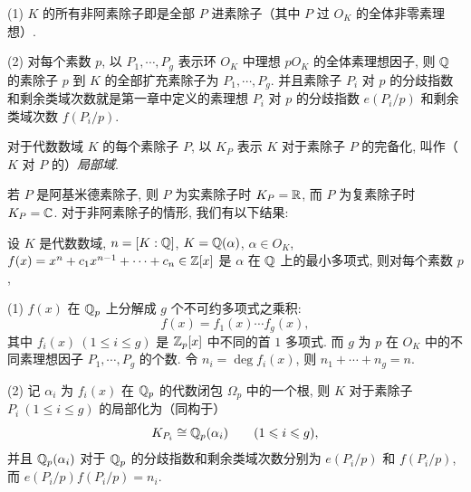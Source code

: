 \begin{theorem}\label{thm:8.21}
(1) $K$ 的所有非阿素除子即是全部 $P$ 进素除子（其中 $P$ 过 $O_K$ 的全体非零素理想）.

(2) 对每个素数 $p$, 以 $P_1,\cdots,P_g$ 表示环 $O_K$ 中理想 $pO_K$ 的全体素理想因子, 则 $\mathbb{Q}$ 的素除子 $p$ 到 $K$ 的全部扩充素除子为 $P_1,\cdots,P_g$. 并且素除子 $P_i$ 对 $p$ 的分歧指数和剩余类域次数就是第一章中定义的素理想 $P_i$ 对 $p$ 的分歧指数 $e(P_i/p)$ 和剩余类域次数 $f(P_i/p)$.
\end{theorem}

\begin{definition}\label{def:ch8-3}
对于代数数域 $K$ 的每个素除子 $P$, 以 $K_P$ 表示 $K$ 对于素除子 $P$ 的完备化, 叫作（$K$ 对 $P$ 的）\emph{局部域}.
\end{definition}

若 $P$ 是阿基米德素除子, 则 $P$ 为实素除子时 $K_P=\mathbb{R}$, 而 $P$ 为复素除子时 $K_P=\mathbb{C}$. 对于非阿素除子的情形, 我们有以下结果:

\begin{theorem}\label{thm:8.22}
设 $K$ 是代数数域, $n=[K:\mathbb{Q}]$, $K=\mathbb{Q}(\alpha)$, $\alpha\in O_K$, $f(x)=x^n+c_1x^{n-1}+\cdots+c_n\in\mathbb{Z}[x]$ 是 $\alpha$ 在 $\mathbb{Q}$ 上的最小多项式, 则对每个素数 $p$,

(1) $f(x)$ 在 $\mathbb{Q}_p$ 上分解成 $g$ 个不可约多项式之乘积:
\[
  f(x)=f_1(x)\cdots f_g(x),
\]
其中 $f_i(x)\ (1\leqslant i\leqslant g)$ 是 $\mathbb{Z}_p[x]$ 中不同的首 $1$ 多项式. 而 $g$ 为 $p$ 在 $O_K$ 中的不同素理想因子 $P_1,\cdots,P_g$ 的个数. 令 $n_i=\deg f_i(x)$, 则 $n_1+\cdots+n_g=n$.

(2) 记 $\alpha_i$ 为 $f_i(x)$ 在 $\mathbb{Q}_p$ 的代数闭包 $\Omega_p$ 中的一个根, 则 $K$ 对于素除子 $P_i\ (1\leqslant i\leqslant g)$ 的局部化为（同构于）
\[
  K_{P_i}\cong\mathbb{Q}_p(\alpha_i)\qquad(1\leqslant i\leqslant g),
\]
并且 $\mathbb{Q}_p(\alpha_i)$ 对于 $\mathbb{Q}_p$ 的分歧指数和剩余类域次数分别为 $e(P_i/p)$ 和 $f(P_i/p)$, 而 $e(P_i/p)f(P_i/p)=n_i$.
\end{theorem}


